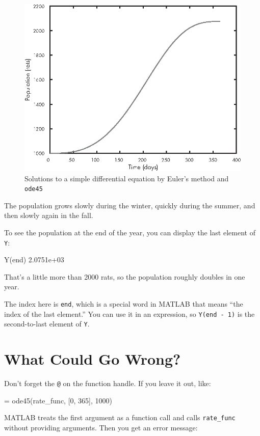 \begin{figure}[ht]
\includegraphics{images/figure09_03_new.eps}
\caption{Solutions to a simple differential equation by Euler's method and \lstinline{ode45}}
\label{fig:rats}
\end{figure}

The population grows slowly during the winter, quickly during the summer, and then slowly again in the fall.

To see the population at the end of the year, you can display the last element of \lstinline{Y}:

\begin{code}
Y(end)
2.0751e+03
\end{code}

That's a little more than 2000 rats, so the population roughly doubles in one year.

The index here is \lstinline{end}, which is a special word in MATLAB that means ``the index of the last element.''  You can use it in an expression, so \lstinline{Y(end - 1)} is the second-to-last element of
\lstinline{Y}.



\section{What Could Go Wrong?}

Don't forget the \lstinline{@} on the function handle.
If you leave it out, like:

\begin{code}
[T, Y] = ode45(rate_func, [0, 365], 1000)
\end{code}
MATLAB treats the first argument as a function
call and calls \lstinline{rate_func} without providing arguments.
Then you get an error message:

